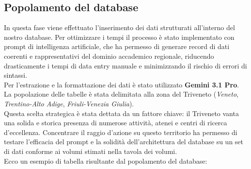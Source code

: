 \documentclass[a4paper,12pt]{article}
\begin{document}
\subsection{Popolamento del database} \label{subsec:popolamento}
In questa fase viene effettuato l'inserimento dei dati strutturati all'interno del nostro database. Per ottimizzare i tempi il processo è stato implementato con prompt di intelligenza artificiale, che ha permesso di generare record di dati coerenti e rappresentativi del dominio accademico regionale, riducendo drasticamente i tempi di data entry manuale e minimizzando il rischio di errori di sintassi.
\\Per l'estrazione e la formattazione dei dati è stato utilizzato \textbf{Gemini 3.1 Pro}.
La popolazione delle tabelle è stata delimitata alla zona del Triveneto (\textit{Veneto}, \textit{Trentino-Alto Adige}, \textit{Friuli-Venezia Giulia}).
\\Questa scelta strategica è stata dettata da un fattore chiave: il Triveneto vanta una solida e storica presenza di numerose attività, atenei e centri di ricerca d'eccellenza.
Concentrare il raggio d'azione su questo territorio ha permesso di testare l'efficacia del prompt e la solidità dell'architettura del database su un set di dati conforme ai volumi stimati nella tavola dei volumi.
\\ Ecco un esempio di tabella risultante dal popolamento del database:
\end{document}
